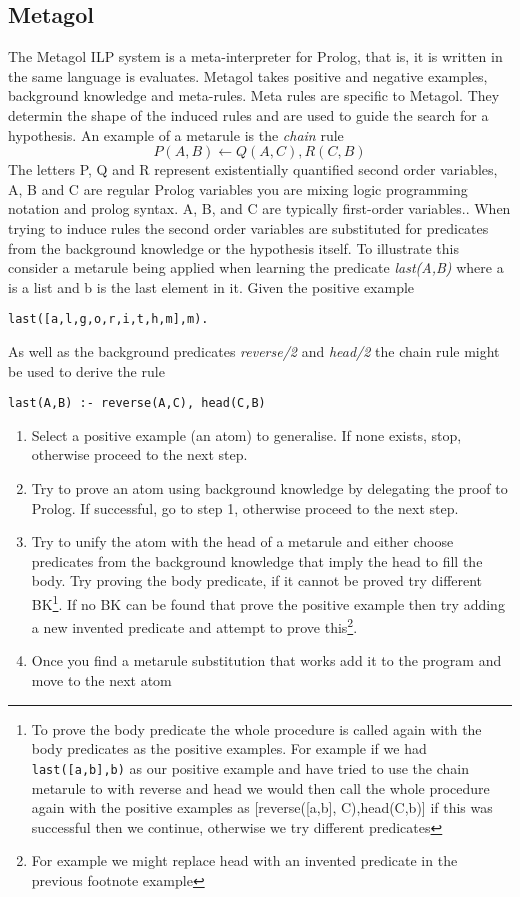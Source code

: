 \subsection{Metagol}
The Metagol ILP system is a meta-interpreter for Prolog, that is, it is written in the same language is evaluates\cite{Cropper/Thesis,Rolf/Metagol,Metagol/Github}. Metagol takes positive and negative examples, background knowledge and meta-rules. Meta rules are specific to Metagol. They determin the shape of the induced rules and are used to guide the search for a hypothesis. An example of a metarule is the \textit{chain} rule \[P(A,B) \leftarrow Q(A,C),R(C,B)\] The letters P, Q and R represent existentially quantified second order variables, A, B and C are regular Prolog variables \ac{you are mixing logic programming notation and prolog syntax. A, B, and C are typically first-order variables.}. When trying to induce rules the second order variables are substituted for predicates from the background knowledge or the hypothesis itself. To illustrate this consider a metarule being applied when learning the predicate \textit{last(A,B)} where a is a list and b is the last element in it. Given the positive example
\begin{verbatim}
last([a,l,g,o,r,i,t,h,m],m).
\end{verbatim}

As well as the background predicates \textit{reverse/2} and \textit{head/2} the chain rule might be used to derive the rule
\begin{verbatim}
last(A,B) :- reverse(A,C), head(C,B)
\end{verbatim}

\begin{enumerate}
\item Select a positive example (an atom) to generalise. If none exists, stop, otherwise proceed to the next step.
\item Try to prove an atom using background knowledge by delegating the proof to Prolog. If successful, go to step 1, otherwise proceed to the next step.
\item Try to unify the atom with the head of a metarule and either choose predicates from the background knowledge that imply the head to fill the body. Try proving the body predicate, if it cannot be proved try different BK\footnote{To prove the body predicate the whole procedure is called again with the body predicates as the positive examples. For example if we had \texttt{last([a,b],b)} as our positive example and have tried to use the chain metarule to with reverse and head we would then call the whole procedure again with the positive examples as [reverse([a,b], C),head(C,b)] if this was successful then we continue, otherwise we try different predicates}. If no BK can be found that prove the positive example then try adding a new invented predicate and attempt to prove this\footnote{For example we might replace head with an invented predicate in the previous footnote example}.
\item Once you find a metarule substitution that works add it to the program and move to the next atom
\end{enumerate}


